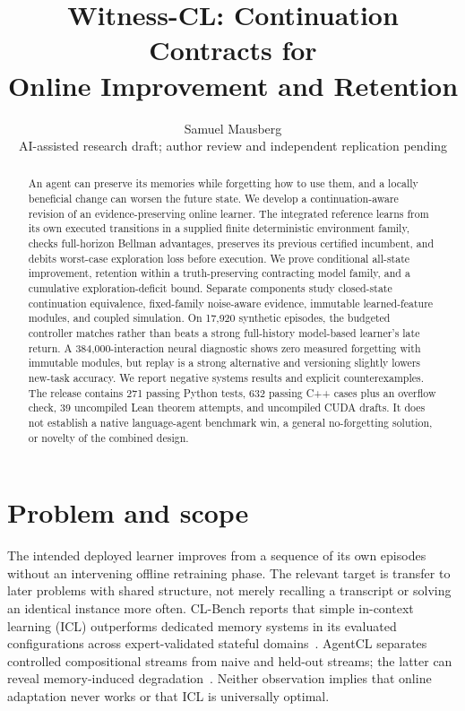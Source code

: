 \documentclass[10pt,twocolumn]{article}
\title{\vspace{-1.2em}\textbf{Witness-CL: Continuation Contracts for\\Online Improvement and Retention}}
\author{Samuel Mausberg\\\small AI-assisted research draft; author review and independent replication pending}
\date{}
\begin{document}
\raggedbottom
\maketitle
\begin{abstract}
An agent can preserve its memories while forgetting how to use them, and a locally
beneficial change can worsen the future state. We develop a continuation-aware
revision of an evidence-preserving online learner. The integrated reference learns
from its own executed transitions in a supplied finite deterministic environment
family, checks full-horizon Bellman advantages, preserves its previous certified
incumbent, and debits worst-case exploration loss before execution. We prove
conditional all-state improvement, retention within a truth-preserving contracting
model family, and a cumulative exploration-deficit bound. Separate components
study closed-state continuation equivalence, fixed-family noise-aware evidence,
immutable learned-feature modules, and coupled simulation. On 17,920 synthetic
episodes, the budgeted controller matches rather than beats a strong full-history
model-based learner's late return. A 384,000-interaction neural diagnostic shows
zero measured forgetting with immutable modules, but replay is a strong alternative
and versioning slightly lowers new-task accuracy. We report negative systems
results and explicit counterexamples. The release contains 271 passing Python
tests, 632 passing C++ cases plus an overflow check, 39 uncompiled Lean theorem
attempts, and uncompiled CUDA drafts. It does not establish a native language-agent
benchmark win, a general no-forgetting solution, or novelty of the combined design.
\end{abstract}

\section{Problem and scope}
The intended deployed learner improves from a sequence of its own episodes without
an intervening offline retraining phase. The relevant target is transfer to later
problems with shared structure, not merely recalling a transcript or solving an
identical instance more often. CL-Bench reports that simple in-context learning
(ICL) outperforms dedicated memory systems in its evaluated configurations across
expert-validated stateful domains~\cite{clbench}. AgentCL separates controlled
compositional streams from naive and held-out streams; the latter can reveal
memory-induced degradation~\cite{agentcl}. Neither observation implies that online
adaptation never works or that ICL is universally optimal.
\end{document}
